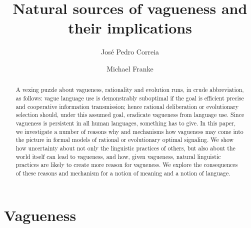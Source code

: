 \documentclass[a4paper]{article}
\begin{document}
\title{Natural sources of vagueness and their implications}
\author{Jos\'e Pedro Correia \and Michael Franke}
\date{}

\maketitle

\begin{abstract}
A vexing puzzle about vagueness, rationality and evolution runs, in crude abbreviation, as follows: vague language use is demonstrably suboptimal if the goal is efficient precise and cooperative information transmission; hence rational deliberation or evolutionary selection should, under this assumed goal, eradicate vagueness from language use.
Since vagueness is persistent in all human languages, something has to give.
In this paper, we investigate a number of reasons why and mechanisms how vagueness may come into the picture in formal models of rational or evolutionary optimal signaling.
We show how uncertainty about not only the linguistic practices of others, but also about the world itself can lead to vagueness, and how, given vagueness, natural linguistic practices are likely to create more reason for vagueness.
We explore the consequences of these reasons and mechanism for a notion of meaning and a notion of language.
\end{abstract}

\tableofcontents

\section{Vagueness}
\label{sec:vagueness}
\end{document}
